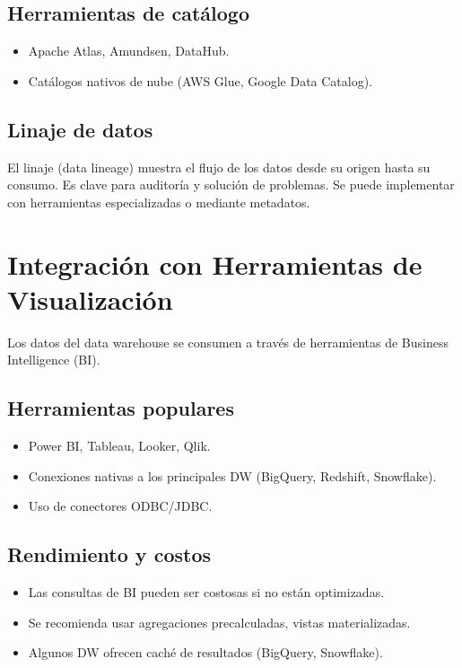 \documentclass[12pt,a4paper,openany,oneside]{book}
\begin{document}
\section{Herramientas de catálogo}
\begin{itemize}
    \item Apache Atlas, Amundsen, DataHub.
    \item Catálogos nativos de nube (AWS Glue, Google Data Catalog).
\end{itemize}

\section{Linaje de datos}
El linaje (data lineage) muestra el flujo de los datos desde su origen hasta su consumo. Es clave para auditoría y solución de problemas. Se puede implementar con herramientas especializadas o mediante metadatos.

\chapter{Integración con Herramientas de Visualización}
Los datos del data warehouse se consumen a través de herramientas de Business Intelligence (BI).

\section{Herramientas populares}
\begin{itemize}
    \item Power BI, Tableau, Looker, Qlik.
    \item Conexiones nativas a los principales DW (BigQuery, Redshift, Snowflake).
    \item Uso de conectores ODBC/JDBC.
\end{itemize}

\section{Rendimiento y costos}
\begin{itemize}
    \item Las consultas de BI pueden ser costosas si no están optimizadas.
    \item Se recomienda usar agregaciones precalculadas, vistas materializadas.
    \item Algunos DW ofrecen caché de resultados (BigQuery, Snowflake).
\end{itemize}
\end{document}
